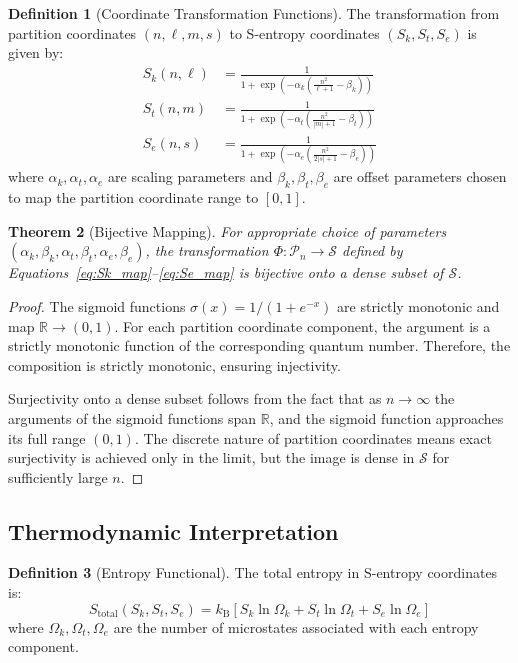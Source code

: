 \documentclass[11pt,twocolumn,a4paper]{article}
\newtheorem{theorem}{Theorem}[section]
\theoremstyle{definition}
\newtheorem{definition}[theorem]{Definition}
\theoremstyle{remark}
\newcommand{\RR}{\mathbb{R}}
\newcommand{\kB}{k_{\mathrm{B}}}
\newcommand{\Sspace}{\mathcal{S}}
\newcommand{\Sk}{S_k}
\newcommand{\St}{S_t}
\newcommand{\Se}{S_e}
\begin{document}
\begin{definition}[Coordinate Transformation Functions]
\label{def:coordinate_transform}
The transformation from partition coordinates $(n,\ell,m,s)$ to S-entropy coordinates $(\Sk,\St,\Se)$ is given by:
\begin{align}
\Sk(n,\ell) &= \frac{1}{1 + \exp\left(-\alpha_k\left(\frac{n^2}{\ell+1} - \beta_k\right)\right)} \label{eq:Sk_map} \\
\St(n,m) &= \frac{1}{1 + \exp\left(-\alpha_t\left(\frac{n^2}{|m|+1} - \beta_t\right)\right)} \label{eq:St_map} \\
\Se(n,s) &= \frac{1}{1 + \exp\left(-\alpha_e\left(\frac{n^2}{2|s|+1} - \beta_e\right)\right)} \label{eq:Se_map}
\end{align}
where $\alpha_k, \alpha_t, \alpha_e$ are scaling parameters and $\beta_k, \beta_t, \beta_e$ are offset parameters chosen to map the partition coordinate range to $[0,1]$.
\end{definition}

\begin{theorem}[Bijective Mapping]
\label{thm:bijective_mapping}
For appropriate choice of parameters $(\alpha_k, \beta_k, \alpha_t, \beta_t, \alpha_e, \beta_e)$, the transformation $\Phi: \mathcal{P}_n \to \Sspace$ defined by Equations~\eqref{eq:Sk_map}--\eqref{eq:Se_map} is bijective onto a dense subset of $\Sspace$.
\end{theorem}

\begin{proof}
The sigmoid functions $\sigma(x) = 1/(1+e^{-x})$ are strictly monotonic and map $\RR \to (0,1)$. For each partition coordinate component, the argument is a strictly monotonic function of the corresponding quantum number. Therefore, the composition is strictly monotonic, ensuring injectivity.

Surjectivity onto a dense subset follows from the fact that as $n \to \infty$ the arguments of the sigmoid functions span $\RR$, and the sigmoid function approaches its full range $(0,1)$. The discrete nature of partition coordinates means exact surjectivity is achieved only in the limit, but the image is dense in $\Sspace$ for sufficiently large $n$.
\end{proof}

\subsection{Thermodynamic Interpretation}

\begin{definition}[Entropy Functional]
\label{def:entropy_functional}
The total entropy in S-entropy coordinates is:
\begin{equation}
S_{\mathrm{total}}(\Sk,\St,\Se) = \kB \left[\Sk \ln\Omega_k + \St \ln\Omega_t + \Se \ln\Omega_e\right]
\label{eq:total_entropy}
\end{equation}
where $\Omega_k, \Omega_t, \Omega_e$ are the number of microstates associated with each entropy component.
\end{definition}
\end{document}
